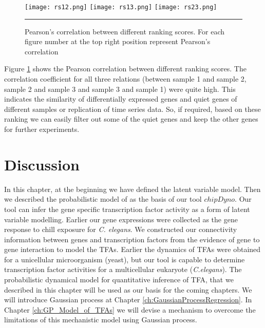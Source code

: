 \begin{figure}
	\centering
		\texttt{[image: rs12.png]}
		\texttt{[image: rs13.png]}
		\texttt{[image: rs23.png]}
		\rule{35em}{0.5pt}
	\caption[Pearson's correlation between different ranking scores]
		{Pearson's correlation between different ranking scores. For each figure number at the top right position represent Pearson's correlation}
	\label{fig:ranking_scores}
\end{figure}

Figure \ref{fig:ranking_scores} shows the Pearson correlation between different ranking scores. The correlation coefficient for all three relations (between sample 1 and sample 2, sample 2 and sample 3 and sample 3 and sample 1) were quite high. This indicates the similarity of differentially expressed genes and quiet genes of different samples or replication of time series data. So, if required, based on these ranking we can easily filter out some of the quiet genes and keep the other genes for further experiments.

\section{Discussion}
In this chapter, at the beginning we have defined the latent variable model. Then we described the probabilistic model of \cite{Sanguinetti:2006} as the basis of our tool $chipDyno$. Our tool can infer the gene specific transcription factor activity as a form of latent variable modelling. Earlier our gene expressions were collected as the gene response to chill exposure for \textit{C. elegans}. We constructed our connectivity information between genes and transcription factors from the evidence of gene to gene interaction to model the TFAs. Earlier the dynamics of TFAs were obtained for a unicellular microorganism (yeast), but our tool is capable to determine transcription factor activities for a multicellular eukaryote (\textit{C.elegans}).
The probabilistic dynamical model for quantitative inference of TFA, that we described in this chapter will be used as our basis for the coming chapters. We will introduce Gaussian process at Chapter \ref{ch:GaussianProcessRegression}. In Chapter \ref{ch:GP_Model_of_TFAs} we will devise a mechanism to overcome the limitations of this mechanistic model using Gaussian process.



% 
%
